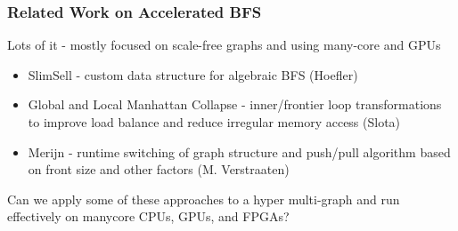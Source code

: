 \documentclass{beamer}
\begin{document}
\begin{frame}
  \frametitle{Related Work on Accelerated BFS}
  Lots of it - mostly focused on scale-free graphs and using many-core
  and GPUs
  \begin{itemize}
    \item SlimSell - custom data structure for algebraic BFS (Hoefler)
    \item Global and Local Manhattan Collapse - inner/frontier loop transformations to
      improve load balance and reduce irregular memory access (Slota)
    \item Merijn - runtime switching of graph structure and push/pull algorithm based
      on front size and other factors (M. Verstraaten)
  \end{itemize}
  Can we apply some of these approaches to a hyper multi-graph and run
  effectively on manycore CPUs, GPUs, and FPGAs?
\end{frame}
\end{document}
